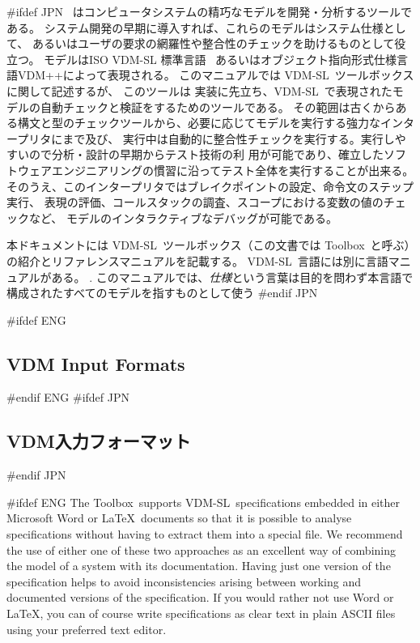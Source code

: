 \documentclass[\pformat,12pt]{article}
\newcommand{\vdmslpp}{VDM-SL}
\newcommand{\Toolbox}{Toolbox}
\newcommand{\vdmslpp}{VDM++}
\newcommand{\Toolbox}{Toolbox}
\begin{document}
#ifdef JPN
\VDMTools\ はコンピュータシステムの精巧なモデルを開発・分析するツールである。
システム開発の早期に導入すれば、これらのモデルはシステム仕様として、
あるいはユーザの要求の網羅性や整合性のチェックを助けるものとして役立つ。
モデルはISO VDM-SL 標準言語~\cite{ISOVDM96}
あるいはオブジェクト指向形式仕様言語VDM++\cite{LangManPP-CSK}\cite{Fitzgerald&05}によって表現される。
このマニュアルでは \vdmslpp\ ツールボックスに関して記述するが、
このツールは 実装に先立ち、\vdmslpp\ で表現されたモデルの自動チェックと検証をするためのツールである。
その範囲は古くからある構文と型のチェックツールから、必要に応じてモデルを実行する強力なインタープリタにまで及び、
実行中は自動的に整合性チェックを実行する。実行しやすいので分析・設計の早期からテスト技術の利
用が可能であり、確立したソフトウェアエンジニアリングの慣習に沿ってテスト全体を実行することが出来る。
そのうえ、このインタープリタではブレイクポイントの設定、命令文のステップ実行、
表現の評価、コールスタックの調査、スコープにおける変数の値のチェックなど、
モデルのインタラクティブなデバッグが可能である。

本ドキュメントには \vdmslpp\ ツールボックス（この文書では \Toolbox\ と呼ぶ）の紹介とリファレンスマニュアルを記載する。
\vdmslpp\ 言語には別に言語マニュアルがある。
.
このマニュアルでは、{\em 仕様\/}という言葉は目的を問わず本言語で構成されたすべてのモデルを指すものとして使う
#endif JPN

#ifdef ENG
\subsection*{VDM Input Formats}
#endif ENG
#ifdef JPN
\subsection*{VDM入力フォーマット}
#endif JPN

#ifdef ENG
The \Toolbox\ supports \vdmslpp\ specifications embedded in either
Microsoft Word or \LaTeX\ documents so that it is possible to analyse
specifications without having to extract them into a special file. We
recommend the use of either one of these two approaches as an
excellent way of combining the model of a system with its
documentation. Having just one version of the specification helps to
avoid inconsistencies arising between working and documented versions
of the specification. If you would rather not use Word or \LaTeX, you
can of course write specifications as clear text in plain ASCII files
using your preferred text editor.
\end{document}
